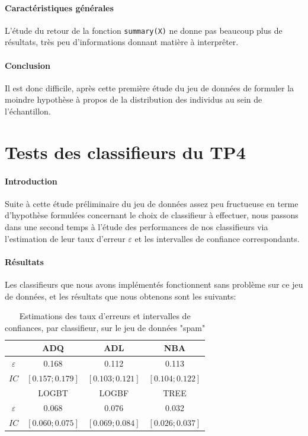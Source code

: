 \documentclass{report}
\begin{document}
\paragraph{Caractéristiques générales}
L'étude du retour de la fonction \verb+summary(X)+ ne donne pas beaucoup plus de résultats, très peu d'informations donnant matière à interprêter.

\paragraph{Conclusion}
Il est donc difficile, après cette première étude du jeu de données de formuler la moindre hypothèse à propos de la distribution des individus au sein de l'échantillon.

\section{Tests des classifieurs du TP4}
\paragraph{Introduction}
Suite à cette étude préliminaire du jeu de données assez peu fructueuse en terme d'hypothèse formulées concernant le choix de classifieur à effectuer, nous passons dans une second temps à l'étude des performances de nos classifieurs via l'estimation de leur taux d'erreur $\varepsilon$ et les intervalles de confiance correspondants.

\paragraph{Résultats}
Les classifieurs que nous avons implémentés fonctionnent sans problème sur ce jeu de données, et les résultats que nous obtenons sont les suivants:

\begin{table}[h!]
    \centering
    \caption{Estimations des taux d'erreurs et intervalles de confiances, par classifieur, sur le jeu de données "spam"}
    \label{tab:table1}
    \def\arraystretch{1.5}
    \begin{tabular}{c||c|c|c}
        \hline
        & ADQ & ADL & NBA\\
        \hline
        $\varepsilon$ & 0.168 & 0.112 & 0.113\\
        \hline
        $IC$ & $[0.157 ; 0.179]$ & $[0.103; 0.121]$ & $[0.104 ; 0.122]$\\
        \hline
        \hline
        & LOGBT & LOGBF & TREE\\
        \hline
        $\varepsilon$ & 0.068 & 0.076
        & 0.032\\
        \hline
        $IC$ & $[0.060 ; 0.075]$ & $[0.069 ; 0.084]$
        & $[0.026 ; 0.037]$\\
        \hline
        \hline
    \end{tabular}
\end{table}
\end{document}
